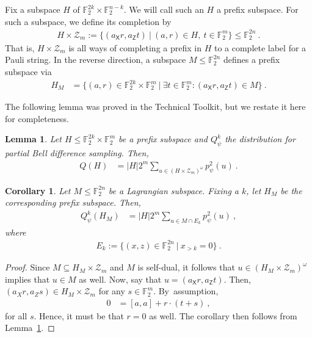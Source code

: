 \documentclass[11pt]{article}
\newtheorem{corollary}[theorem]{Corollary}
\newtheorem{lemma}[theorem]{Lemma}
\newcommand{\Z}{\mathsf{Z}}
\newcommand{\X}{\mathsf{X}}
\newcommand{\F}{\mathbb{F}}
\begin{document}
Fix a subspace $H$ of $\F_2^{2k}\times \F_2^{n-k}$. We will call such an $H$ a prefix subspace. For such a subspace, we define its completion by
\begin{align}
    H \times \mathcal{Z}_m := \{(a_\X r, a_\Z t)\ \vert \ (a,r) \in H,\ t\in\F_2^m \} \leq \F_2^{2n}\ .
\end{align}
That is, $H\times \mathcal{Z}_m$ is all ways of completing a prefix in $H$ to a complete label for a Pauli string. In the reverse direction, a subspace $M\leq \F_2^{2n}$ defines a prefix subspace via
\begin{align}
    H_M & = \{ (a,r) \in \F_2^{2k}\times \F_2^{m}\ \vert \ \exists t\in \F_2^m: (a_\X r, a_\Z t) \in M \}\ .
\end{align}

The following lemma was proved in the Technical Toolkit, but we restate it here for completeness.

\begin{lemma}\label{lem:bell_subspace}
    Let $H \leq \F_2^{2k} \times \F_2^{m}$ be a prefix subspace and $Q_\psi^k$ the distribution for partial Bell difference sampling. Then,
    \begin{align}
        Q(H) & = \vert H \vert 2^m \sum_{u\in(H\times \mathcal{Z}_m)^\omega}p^2_\psi(u)\ .
    \end{align}
\end{lemma}
\begin{corollary}\label{cor:prefix_lagrangian}
    Let $M\leq \F_2^{2n}$ be a Lagrangian subspace. Fixing a $k$, let $H_M$ be the corresponding prefix subspace. Then,
    \begin{align}
        Q^k_\psi(H_M) & = \vert H \vert 2^m \sum_{u \in M\cap E_k}p_\psi^2(u)\ ,
    \end{align}
    where
    \begin{align}
        E_k := \{(x,z) \in \F_2^{2n}\ \vert \ x_{>k}= 0\}\ .
    \end{align}
\end{corollary}
\begin{proof}
    Since $M \subseteq H_M \times \mathcal{Z}_m$ and $M$ is self-dual, it follows that $u \in (H_M\times \mathcal{Z}_m)^\omega$ implies that $u\in M$ as well. Now, say that $u=(a_\X r, a_\Z t)$. Then, $(a_X r, a_Z s)\in H_M\times \mathcal{Z}_m$ for any $s \in \F_2^m$. By~assumption,
    \begin{align}
        0 & = [a,a] + r\cdot (t+s) \ ,
    \end{align}
    for all $s$. Hence, it must be that $r=0$ as well. The corollary then follows from Lemma~\ref{lem:bell_subspace}.
\end{proof}
\end{document}
